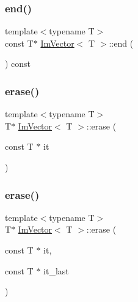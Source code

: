 \mbox{\label{structImVector_a541696299caf4b0477e57b27db70d32c}} 
\subsubsection{\texorpdfstring{end()}{end()}\hspace{0.1cm}{\footnotesize\ttfamily [2/2]}}
{\footnotesize\ttfamily template$<$typename T$>$ \\
const T$\ast$ \hyperlink{structImVector}{Im\+Vector}$<$ T $>$\+::end (\begin{DoxyParamCaption}{ }\end{DoxyParamCaption}) const\hspace{0.3cm}{\ttfamily [inline]}}

\mbox{\label{structImVector_af44d62675eb411f655da9cced5237456}} 
\subsubsection{\texorpdfstring{erase()}{erase()}\hspace{0.1cm}{\footnotesize\ttfamily [1/2]}}
{\footnotesize\ttfamily template$<$typename T$>$ \\
T$\ast$ \hyperlink{structImVector}{Im\+Vector}$<$ T $>$\+::erase (\begin{DoxyParamCaption}\item[{const T $\ast$}]{it }\end{DoxyParamCaption})\hspace{0.3cm}{\ttfamily [inline]}}

\mbox{\label{structImVector_a061554df4aff14deece181d6c46abb9f}} 
\subsubsection{\texorpdfstring{erase()}{erase()}\hspace{0.1cm}{\footnotesize\ttfamily [2/2]}}
{\footnotesize\ttfamily template$<$typename T$>$ \\
T$\ast$ \hyperlink{structImVector}{Im\+Vector}$<$ T $>$\+::erase (\begin{DoxyParamCaption}\item[{const T $\ast$}]{it,  }\item[{const T $\ast$}]{it\+\_\+last }\end{DoxyParamCaption})\hspace{0.3cm}{\ttfamily [inline]}}

